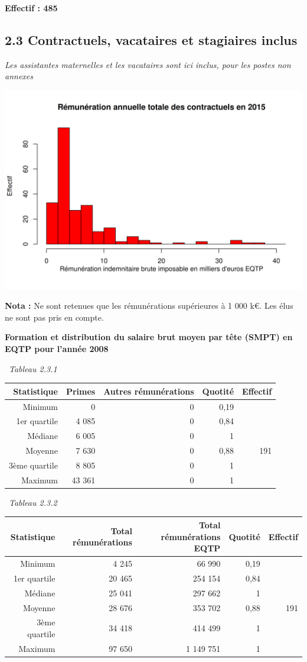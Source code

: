 \textbf{Effectif : 485 }

\hypertarget{contractuels-vacataires-et-stagiaires-inclus}{%
\subsection{2.3 Contractuels, vacataires et stagiaires
inclus}\label{contractuels-vacataires-et-stagiaires-inclus}}

\emph{Les assistantes maternelles et les vacataires sont ici inclus,
pour les postes non annexes}

\includegraphics{altair_files/figure-latex/unnamed-chunk-61-1.png}

\textbf{Nota :} Ne sont retenues que les rémunérations supérieures à 1
000 k€. Les élus ne sont pas pris en compte.

\textbf{Formation et distribution du salaire brut moyen par tête (SMPT)
en EQTP pour l'année 2008 }

~\emph{Tableau 2.3.1}

\begin{longtable}[]{@{}rrrrr@{}}
\toprule
Statistique & Primes & Autres rémunérations & Quotité &
Effectif\tabularnewline
\midrule
\endhead
Minimum & 0 & 0 & 0,19 &\tabularnewline
1er quartile & 4 085 & 0 & 0,84 &\tabularnewline
Médiane & 6 005 & 0 & 1 &\tabularnewline
Moyenne & 7 630 & 0 & 0,88 & 191\tabularnewline
3ème quartile & 8 805 & 0 & 1 &\tabularnewline
Maximum & 43 361 & 0 & 1 &\tabularnewline
\bottomrule
\end{longtable}

~\emph{Tableau 2.3.2}

\begin{longtable}[]{@{}rrrrr@{}}
\toprule
Statistique & Total rémunérations & Total rémunérations EQTP & Quotité &
Effectif\tabularnewline
\midrule
\endhead
Minimum & 4 245 & 66 990 & 0,19 &\tabularnewline
1er quartile & 20 465 & 254 154 & 0,84 &\tabularnewline
Médiane & 25 041 & 297 662 & 1 &\tabularnewline
Moyenne & 28 676 & 353 702 & 0,88 & 191\tabularnewline
3ème quartile & 34 418 & 414 499 & 1 &\tabularnewline
Maximum & 97 650 & 1 149 751 & 1 &\tabularnewline
\bottomrule
\end{longtable}

